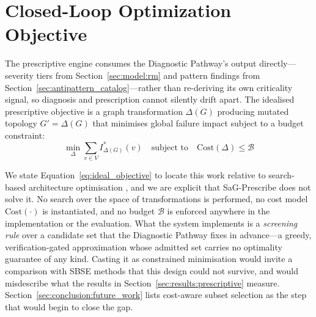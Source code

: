 \section{Closed-Loop Optimization Objective}
\label{sec:optimization_objective}

The prescriptive engine consumes the Diagnostic Pathway's output directly---severity tiers from Section~\ref{sec:model:rm} and pattern findings from Section~\ref{sec:antipattern_catalog}---rather than re-deriving its own criticality signal, so diagnosis and prescription cannot silently drift apart. The idealised prescriptive objective is a graph transformation $\Delta(G)$ producing mutated topology $G' = \Delta(G)$ that minimises global failure impact subject to a budget constraint:
\begin{equation}
\min_{\Delta} \sum_{v \in V} I^*_{\Delta(G)}(v) \quad \text{subject to} \quad \mathrm{Cost}(\Delta) \le \mathcal{B}
\label{eq:ideal_objective}
\end{equation}

We state Equation~\ref{eq:ideal_objective} to locate this work relative to search-based architecture optimisation \citep{harman2012sbse, aleti2013software, koziolek2011peropteryx}, and we are explicit that SaG-Prescribe does not solve it. No search over the space of transformations is performed, no cost model $\mathrm{Cost}(\cdot)$ is instantiated, and no budget $\mathcal{B}$ is enforced anywhere in the implementation or the evaluation. What the system implements is a \emph{screening rule} over a candidate set that the Diagnostic Pathway fixes in advance---a greedy, verification-gated approximation whose admitted set carries no optimality guarantee of any kind. Casting it as constrained minimisation would invite a comparison with SBSE methods that this design could not survive, and would misdescribe what the results in Section~\ref{sec:results:prescriptive} measure. Section~\ref{sec:conclusion:future_work} lists cost-aware subset selection as the step that would begin to close the gap.

